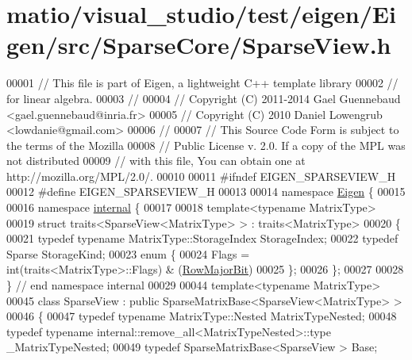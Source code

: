 \hypertarget{matio_2visual__studio_2test_2eigen_2_eigen_2src_2_sparse_core_2_sparse_view_8h_source}{}\section{matio/visual\+\_\+studio/test/eigen/\+Eigen/src/\+Sparse\+Core/\+Sparse\+View.h}
\label{matio_2visual__studio_2test_2eigen_2_eigen_2src_2_sparse_core_2_sparse_view_8h_source}

\begin{DoxyCode}
00001 \textcolor{comment}{// This file is part of Eigen, a lightweight C++ template library}
00002 \textcolor{comment}{// for linear algebra.}
00003 \textcolor{comment}{//}
00004 \textcolor{comment}{// Copyright (C) 2011-2014 Gael Guennebaud <gael.guennebaud@inria.fr>}
00005 \textcolor{comment}{// Copyright (C) 2010 Daniel Lowengrub <lowdanie@gmail.com>}
00006 \textcolor{comment}{//}
00007 \textcolor{comment}{// This Source Code Form is subject to the terms of the Mozilla}
00008 \textcolor{comment}{// Public License v. 2.0. If a copy of the MPL was not distributed}
00009 \textcolor{comment}{// with this file, You can obtain one at http://mozilla.org/MPL/2.0/.}
00010 
00011 \textcolor{preprocessor}{#ifndef EIGEN\_SPARSEVIEW\_H}
00012 \textcolor{preprocessor}{#define EIGEN\_SPARSEVIEW\_H}
00013 
00014 \textcolor{keyword}{namespace }\hyperlink{namespace_eigen}{Eigen} \{ 
00015 
00016 \textcolor{keyword}{namespace }\hyperlink{namespaceinternal}{internal} \{
00017 
00018 \textcolor{keyword}{template}<\textcolor{keyword}{typename} MatrixType>
00019 \textcolor{keyword}{struct }traits<SparseView<MatrixType> > : traits<MatrixType>
00020 \{
00021   \textcolor{keyword}{typedef} \textcolor{keyword}{typename} MatrixType::StorageIndex StorageIndex;
00022   \textcolor{keyword}{typedef} Sparse StorageKind;
00023   \textcolor{keyword}{enum} \{
00024     Flags = int(traits<MatrixType>::Flags) & (\hyperlink{group__flags_gae4f56c2a60bbe4bd2e44c5b19cbe8762}{RowMajorBit})
00025   \};
00026 \};
00027 
00028 \} \textcolor{comment}{// end namespace internal}
00029 
00044 \textcolor{keyword}{template}<\textcolor{keyword}{typename} MatrixType>
00045 \textcolor{keyword}{class }SparseView : \textcolor{keyword}{public} SparseMatrixBase<SparseView<MatrixType> >
00046 \{
00047   \textcolor{keyword}{typedef} \textcolor{keyword}{typename} MatrixType::Nested MatrixTypeNested;
00048   \textcolor{keyword}{typedef} \textcolor{keyword}{typename} internal::remove\_all<MatrixTypeNested>::type \_MatrixTypeNested;
00049   \textcolor{keyword}{typedef} SparseMatrixBase<SparseView > Base;

\end{DoxyCode}

